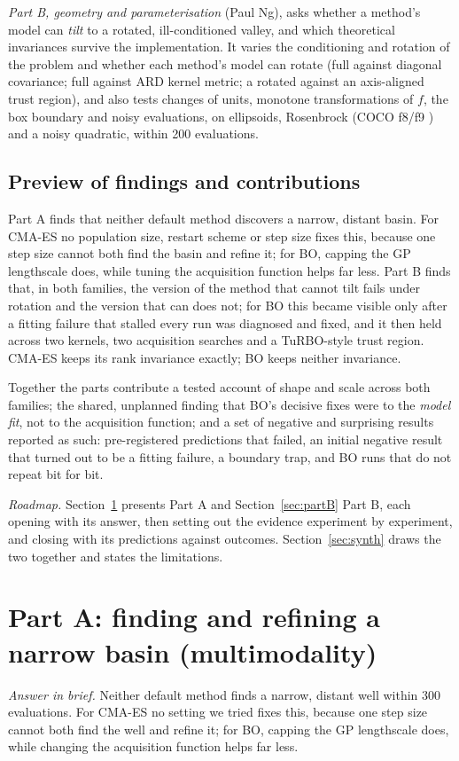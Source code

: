\documentclass[10pt,a4paper]{article}
\begin{document}
\emph{Part B, geometry and parameterisation} (Paul Ng), asks whether a method's model can \emph{tilt} to a
rotated, ill-conditioned valley, and which theoretical invariances survive the implementation. It varies the
conditioning and rotation of the problem and whether each method's model can rotate (full against diagonal
covariance; full against ARD kernel metric; a rotated against an axis-aligned trust region), and also tests
changes of units, monotone transformations of $f$, the box boundary and noisy evaluations, on ellipsoids,
Rosenbrock (COCO f8/f9 \citep{hansen2009bbobfunctions}) and a noisy quadratic, within 200 evaluations.

\subsection{Preview of findings and contributions}
Part A finds that neither default method discovers a narrow, distant basin. For CMA-ES no population size,
restart scheme or step size fixes this, because one step size cannot both find the basin and refine it; for BO,
capping the GP lengthscale does, while tuning the acquisition function helps far less. Part B finds that, in both
families, the version of the method that cannot tilt fails under rotation and the version that can does not; for
BO this became visible only after a fitting failure that stalled every run was diagnosed and fixed, and it then
held across two kernels, two acquisition searches and a TuRBO-style trust region. CMA-ES keeps its rank invariance
exactly; BO keeps neither invariance.

Together the parts contribute a tested account of shape and scale across both families; the shared, unplanned
finding that BO's decisive fixes were to the \emph{model fit}, not to the acquisition function; and a set of
negative and surprising results reported as such: pre-registered predictions that failed, an initial negative
result that turned out to be a fitting failure, a boundary trap, and BO runs that do not repeat bit for bit.

\emph{Roadmap.} Section~\ref{sec:partA} presents Part A and Section~\ref{sec:partB} Part B, each opening with its
answer, then setting out the evidence experiment by experiment, and closing with its predictions against outcomes. Section~\ref{sec:synth} draws the two together and states the limitations.

\section{Part A: finding and refining a narrow basin (multimodality)}\label{sec:partA}
\emph{Answer in brief.} Neither default method finds a narrow, distant well within 300 evaluations. For CMA-ES
no setting we tried fixes this, because one step size cannot both find the well and refine it; for BO, capping
the GP lengthscale does, while changing the acquisition function helps far less.
\end{document}
